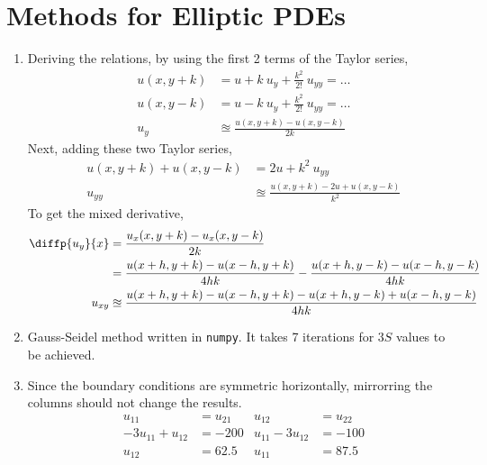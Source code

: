 \section{Methods for Elliptic PDEs}

\begin{enumerate}
    \item Deriving the relations, by using the first 2 terms of the Taylor series,
          \begin{align}
              u(x, y+k) & = u + k\ u_y + \frac{k^2}{2!}\ u_{yy} = \dots \\
              u(x, y-k) & = u - k\ u_y+ \frac{k^2}{2!}\ u_{yy} = \dots  \\
              u_y       & \approxeq \frac{u(x, y+k) - u(x, y-k)}{2k}
          \end{align}
          Next, adding these two Taylor series,
          \begin{align}
              u(x, y+k) + u(x, y-k) & = 2u + k^2\ u_{yy}                               \\
              u_{yy}                & \approxeq \frac{u(x, y+k) - 2u + u(x, y-k)}{k^2}
          \end{align}
          To get the mixed derivative,
          \begin{align}
              \diffp{u_y}{x} & = \frac{u_x(x, y+k) - u_x(x, y-k)}{2k}    \\
                             & = \frac{u(x+h, y+k) - u(x-h, y+k)}{4hk}
              - \frac{u(x+h, y-k) - u(x-h, y-k)}{4hk}                    \\
              u_{xy}         & \approxeq \frac{u(x+h, y+k) - u(x-h, y+k)
                  - u(x+h, y-k) + u(x-h, y-k)}{4hk}
          \end{align}

    \item Gauss-Seidel method written in \texttt{numpy}. It takes 7 iterations for
          $ 3S $ values to be achieved.

    \item Since the boundary conditions are symmetric horizontally, mirrorring
          the columns should not change the results.
          \begin{align}
              u_{11}            & = u_{21} & u_{12}           & = u_{22} \\
              -3u_{11} + u_{12} & = -200   & u_{11} - 3u_{12} & = -100   \\
              u_{12}            & = 62.5   & u_{11}           & = 87.5
          \end{align}


\end{enumerate}
